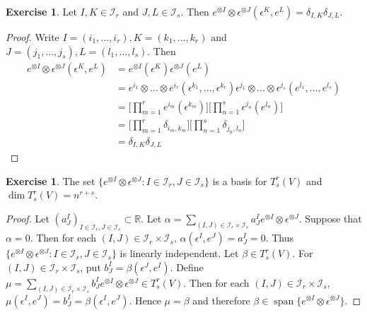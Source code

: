 \documentclass[12pt]{amsart}
\theoremstyle{definition}
\newtheorem{ex}[definition]{Exercise}
\newcommand{\al}{\alpha}
\newcommand{\bet}{\beta}
\newcommand{\del}{\delta}
\newcommand{\ep}{\epsilon}
\newcommand{\R}{\mathbb{R}}
\newcommand{\MI}{\mathcal{I}}
\DeclareMathOperator{\spn}{span}
\begin{document}
	\begin{ex}
	Let $I, K \in \MI_r$  and $J, L \in \MI_s$. Then $e^{\otimes I} \otimes \ep^{\otimes J}(\ep^K, e^L) = \del_{I,K} \del_{J,L}$. 
	\end{ex}	
	
	\begin{proof}
	Write $I = (i_1, \dots, i_r), K=(k_1, \dots, k_r)$ and $J = (j_1, \dots, j_s), L = (l_1, \dots, l_s)$. Then 
	\begin{align*}
	e^{\otimes I} \otimes \ep^{\otimes J}(\ep^K, e^L) 
	&= e^{\otimes I}(\ep^K)\ep^{\otimes J}(e^L) \\
	&= e^{i_1}\otimes \dots \otimes e^{i_r}(\ep^{k_1}, \dots, \ep^{k_r}) \ep^{j_1}\otimes \dots \otimes \ep^{j_s}(e^{l_1}, \dots, e^{l_s}) \\
	&=\bigg[\prod_{m=1}^r e^{i_m}(\ep^{k_m}) \bigg] \bigg[ \prod_{n=1}^s  \ep^{j_n}(e^{l_n}) \bigg] \\
	&= \bigg[\prod_{m=1}^r \del_{i_m, k_m} \bigg] \bigg[ \prod_{n=1}^s  \del_{j_n, l_n} \bigg] \\
	&= \del_{I,K}\del_{J,L}
	\end{align*}
\end{proof}		
		
	\begin{ex}
		The set $\{e^{\otimes I} \otimes \ep^{\otimes J}: I \in \MI_r, J \in \MI_s\}$ is a basis for $T^r_s(V)$ and $\dim T^r_s(V) = {n^{r+s}}$.
	\end{ex}

	\begin{proof}
		Let $(a^I_J)_{I \in \MI_r, J \in \MI_s} \subset \R$. Let $\al = \sum\limits_{(I,J) \in \MI_r \times \MI_s} a^I_J e^{\otimes I} \otimes  \ep^{\otimes J}$. 
		Suppose that $\al = 0$. Then for each $(I,J) \in \MI_r \times \MI_s$, $\al(\ep^I, e^J) = a^I_J = 0$. Thus $\{e^{\otimes I} \otimes \ep^{\otimes J}: I \in \MI_r, J \in \MI_s\}$ is linearly independent. Let $\bet \in T^r_s(V)$. For $(I,J) \in \MI_r \times \MI_s$, put $b^I_J = \bet(\ep^J, e^I)$. Define $\mu = \sum\limits_{(I,J) \in \MI_r \times \MI_s} b^I_J e^{\otimes I} \otimes \ep^{\otimes J} \in T^r_s(V)$. Then for each $(I,J) \in \MI_r \times \MI_s$, $\mu(\ep^I, e^J) = b^I_J = \bet(\ep^I, e^J)$. Hence $\mu = \bet$ and therefore $\bet \in \spn \{e^{\otimes I} \otimes \ep^{\otimes J} \}$.
	\end{proof}		
		
		
		
		
	
	
	
	
	
\end{document}
